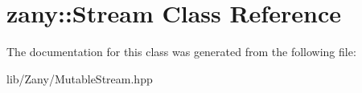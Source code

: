 \hypertarget{classzany_1_1_stream}{}\section{zany\+:\+:Stream Class Reference}
\label{classzany_1_1_stream}


The documentation for this class was generated from the following file\+:\begin{DoxyCompactItemize}
\item 
lib/\+Zany/Mutable\+Stream.\+hpp\end{DoxyCompactItemize}
